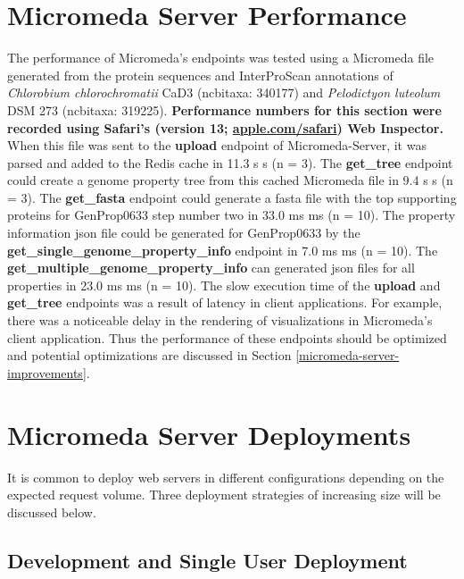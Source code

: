 \section{Micromeda Server Performance} \label{micromeda-server-performance}

The performance of Micromeda's endpoints was tested using a Micromeda file 
generated from the protein sequences and InterProScan annotations of 
\textit{Chlorobium chlorochromatii} CaD3 (\gls{ncbitaxa}: 340177) and 
\textit{Pelodictyon luteolum} DSM 273 (\gls{ncbitaxa}:  319225). 
\textbf{Performance numbers for this section were recorded using Safari's 
(version 13; \href{http://apple.com/safari}{apple.com/safari}) Web Inspector.} 
When this file was sent to the \textbf{upload} endpoint of Micromeda-Server, it 
was parsed and added to the Redis cache in 11.3 s  s (\gls{n} = 3). 
The \textbf{get\_tree} endpoint could create a genome property tree from this 
cached Micromeda file in 9.4 s  s (\gls{n} = 3). The 
\textbf{get\_fasta} endpoint could generate a \gls{fasta} file with the top supporting 
proteins for GenProp0633 step number two in 33.0 ms  ms (\gls{n} = 
10). The property information \gls{json} file could be generated for GenProp0633 
by the \textbf{get\_single\_genome\_property\_info} endpoint in 7.0 ms  ms (\gls{n} = 10). The \textbf{get\_multiple\_genome\_property\_info} can 
generated \gls{json} files for all properties in 23.0 ms  ms (\gls{n} 
= 10). The slow execution time of the \textbf{upload} and \textbf{get\_tree} 
endpoints was a result of latency in client applications. For example, there was 
a noticeable delay in the rendering of visualizations in Micromeda's client 
application. Thus the performance of these endpoints should be optimized and 
potential optimizations are discussed in Section 
\ref{micromeda-server-improvements}.

\section{Micromeda Server Deployments} \label{micromeda-server-deployments}

It is common to deploy web servers in different configurations depending on the 
expected request volume. Three deployment strategies of increasing size will be 
discussed below. 

\subsection{Development and Single User Deployment}

